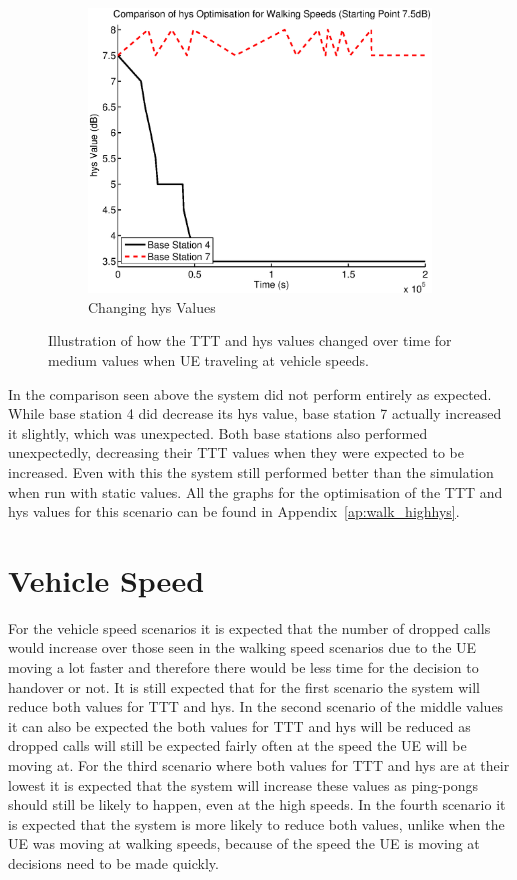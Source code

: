 \begin{figure}[H]
\begin{subfigure}[b]{0.49\textwidth}
                \includegraphics[width=\textwidth]{figures/walking_figures/highhys/long_hys.eps}
                \caption{Changing hys Values}
                \label{fig:walk_highhys_hys}
        \end{subfigure}
        \caption{Illustration of how the TTT and hys values changed over time for medium values when UE traveling at vehicle speeds.}\label{fig:walk_highhys_ttthys}
\end{figure}
In the comparison seen above the system did not perform entirely as expected.  While base station 4 did decrease its hys value, base station 7 actually increased it slightly, which was unexpected. Both base stations also performed unexpectedly, decreasing their TTT values when they were expected to be increased. Even with this the system still performed better than the simulation when run with static values. All the graphs for the optimisation of the TTT and hys values for this scenario can be found in Appendix~\ref{ap:walk_highhys}.

\section{Vehicle Speed}\label{veh}
For the vehicle speed scenarios it is expected that the number of dropped calls would increase over those seen in the walking speed scenarios due to the UE moving a lot faster and therefore there would be less time for the decision to handover or not. It is still expected that for the first scenario the system will reduce both values for TTT and hys. In the second scenario of the middle values it can also be expected the both values for TTT and hys will be reduced as dropped calls will still be expected fairly often at the speed the UE will be moving at. For the third scenario where both values for TTT and hys are at their lowest it is expected that the system will increase these values as ping-pongs should still be likely to happen, even at the high speeds. In the fourth scenario it is expected that the system is more likely to reduce both values, unlike when the UE was moving at walking speeds, because of the speed the UE is moving at decisions need to be made quickly.
